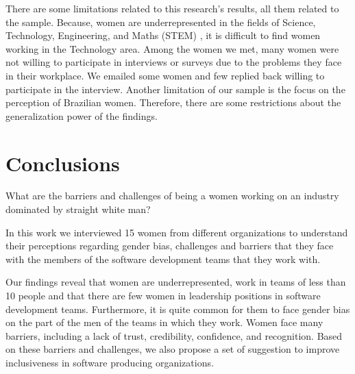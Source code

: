 \documentclass{IEEEcsmag}
\begin{document}
There are some limitations related to this research's results, all them related to the sample. Because, women are underrepresented in the fields of Science, Technology, Engineering, and Maths (STEM) \cite{DBLP:journals/entropy/BotellaRLM19}, it is difficult to find women working in the Technology area. Among the women we met, many women were not willing to participate in interviews or surveys due to the problems they face in their workplace. We emailed some women and few replied back willing to participate in the interview.  Another limitation of our sample is the focus on the perception of Brazilian women. Therefore, there are some restrictions about the generalization power of the findings.

\section{Conclusions}

What are the barriers and challenges of being a women working on an industry dominated by straight white man?

In this work we interviewed 15 women from different organizations to understand their perceptions regarding gender bias, challenges and barriers that they face with the members of the software development teams that they work with. 

Our findings reveal that women are underrepresented, work in teams of less than 10 people and that there are few women in leadership positions in software development teams. Furthermore, it is quite common for them to face gender bias on the part of the men of the teams in which they work. Women face many barriers, including a lack of trust, credibility, confidence, and recognition. Based on these barriers and challenges, we also propose a set of suggestion to improve inclusiveness in software producing organizations. 
\end{document}
